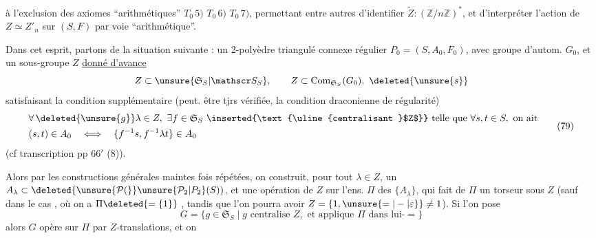 à l'exclusion des axiomes ``arithmétiques'' $T_0\,5)$ $T_0\,6)$ $T_0\,7)$, permettant entre autres d'identifier $\widetilde Z:(\mathbb Z/n\mathbb Z)^*$, et d'interpréter l'action de $Z\simeq Z'_n$ sur $(S,F)$ par voie ``arithmétique''.

Dans cet esprit, partons de la situation suivante : un 2-polyèdre triangulé connexe régulier $P_0=(S,A_0,F_0)$, avec groupe d'autom. $G_0$, et un sous-groupe $Z$ \uline{donné d'avance}
\[
Z\subset\unsure{\mathfrak S_S|\mathscr S_S},\qquad Z\subset\mathrm{Com}_{\mathfrak S_S}(G_0),\ \deleted{\unsure{s}}
\]
satisfaisant la condition supplémentaire (peut. être tjrs vérifiée,  la condition draconienne de régularité)
\[
\begin{aligned}
&\forall\,\deleted{\unsure{g}}\lambda\in Z,\ \exists f\in\mathfrak S_S\ \inserted{\text{\uline{centralisant }$Z$}}\ \text{telle que }\forall s,t\in S,\ \text{on ait}\\
&(s,t)\in A_0\quad\Longleftrightarrow\quad\{f^{-1}s,f^{-1}\lambda t\}\in A_0
\end{aligned}\tag*{(79)}
\]
(cf transcription pp 66$'$ (8)).

Alors par les constructions générales maintes fois répétées, on construit, pour tout $\lambda\in Z$, un $A_\lambda\subset\deleted{\unsure{\mathcal P(}}\unsure{\mathcal P_2|P_2}(S))$, et une opération  de $Z$ sur l'ens. $\Pi$  des $\{A_\lambda\}$,  qui fait de $\Pi$ un torseur sous $Z$ (sauf dans le cas , où on a $\Pi\deleted{=\{1\}}$ , tandis que l'on pourra avoir $Z=\{1,\unsure{=|-|\varepsilon}\}\ne1$).
Si l'on pose
\[
G=\{g\in\mathfrak S_S\mid g\text{ centralise }Z,\text{ et applique }\Pi\text{ dans lui-}=\}
\tag*{(80)}
\]
alors $G$ opère sur $\Pi$ par $Z$-translations, et on
